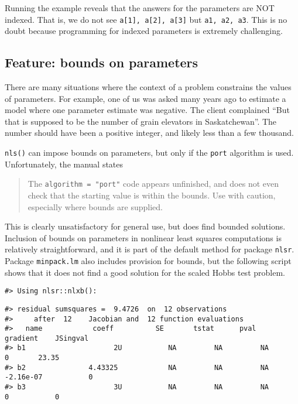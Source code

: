 Running the example reveals that the answers for the parameters are NOT indexed.
That is, we do not see \texttt{a{[}1{]},\ a{[}2{]},\ a{[}3{]}} but \texttt{a1,\ a2,\ a3}.
This is no doubt because programming for indexed parameters is extremely challenging.

\hypertarget{feature-bounds-on-parameters}{%
\subsection{Feature: bounds on parameters}\label{feature-bounds-on-parameters}}

There are many situations where the context of a problem constrains the values of
parameters. For example, one of us was asked many years ago to estimate a model
where one parameter estimate was negative. The client complained ``But that is
supposed to be the number of grain elevators in Saskatchewan''. The number
should have been a positive integer, and likely less than a few thousand.

\texttt{nls()} can impose bounds on parameters, but only if the \texttt{port} algorithm is used.
Unfortunately, the manual states

\begin{quote}
The \texttt{algorithm\ =\ "port"} code appears unfinished, and does not even check that the starting
value is within the bounds. Use with caution, especially where bounds are supplied.
\end{quote}

This is clearly unsatisfactory for general use, but does find bounded solutions.
Inclusion of bounds on parameters in nonlinear least squares computations is
relatively straightforward, and it is part of the default method
for package \texttt{nlsr}. Package \texttt{minpack.lm} also includes provision for bounds, but
the following script
shows that it does not find a good solution for the scaled Hobbs test problem.

\begin{verbatim}
#> Using nlsr::nlxb():
\end{verbatim}

\begin{verbatim}
#> residual sumsquares =  9.4726  on  12 observations
#>     after  12    Jacobian and  12 function evaluations
#>   name            coeff          SE       tstat      pval      gradient    JSingval   
#> b1                     2U           NA         NA         NA           0       23.35  
#> b2               4.43325            NA         NA         NA   -2.16e-07           0  
#> b3                     3U           NA         NA         NA           0           0
\end{verbatim}

